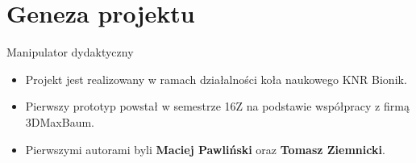 \documentclass{beamer}
\begin{document}
\section{Geneza projektu}
\begin{frame}{Manipulator dydaktyczny}
			\begin{itemize}
				\item {
					Projekt jest realizowany w ramach działalności koła naukowego KNR Bionik.
				}
				\item {
					Pierwszy prototyp powstał w semestrze 16Z na podstawie współpracy z firmą 3DMaxBaum.
				}
				\item {
					Pierwszymi autorami byli \textbf{Maciej Pawliński} oraz \textbf{Tomasz Ziemnicki}.	 	
				}
			\end{itemize}
			\begin{figure}%
				\centering
				\qquad
				\label{fig:example}%
			\end{figure}
\end{frame}
\end{document}
